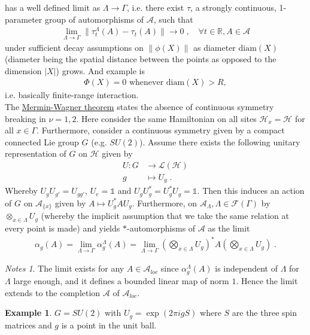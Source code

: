 \documentclass[
a4paper, %
11pt, %
onecolumn, %
openany, %
]{memoir}
\theoremstyle{definition}
\newtheorem{example}[definition]{Example}
\theoremstyle{remark}
\newtheorem{notes}[definition]{Notes}
\theoremstyle{plain}
\begin{document}
has a well defined limit as $\Lambda\rightarrow\Gamma$, i.e. there exist $\tau$, a strongly continuous, 1-parameter group of automorphisms of $\mathcal{A}$, such that \begin{align}
\lim\limits_{\Lambda\rightarrow\Gamma}\|\tau_t^{\Lambda}(A)-\tau_t(A)\|\rightarrow 0\; , \quad \forall t\in\mathbb{R},A\in\mathcal{A}
\end{align}
under sufficient decay assumptions on $\|\phi(X)\|$ as diameter $\mathrm{diam}(X)$ (diameter being the spatial distance between the points as opposed to the dimension $|X|$) grows. And example is \begin{align}
\Phi(X)=0 \text{ whenever } \mathrm{diam}(X) > R, 
\end{align} i.e. basically finite-range interaction.\\
The \underline{Mermin-Wagner theorem} states the absence of continuous symmetry breaking in $\nu=1,2$. Here consider the same Hamiltonian on all sites $\mathcal{H}_x=\mathcal{H}$ for all $x\in\Gamma$. Furthermore, consider a continuous symmetry given by a compact connected Lie group $G$ (e.g. $SU(2)$). Assume there exists the following unitary representation of $G$ on $\mathcal{H}$ given by \begin{align}
U:G&\longrightarrow \mathcal{L}(\mathcal{H}) \\
g&\longmapsto U_g\; .
\end{align}
Whereby $U_gU_{g'}=U_{gg'}$, $U_{e}=\mathds{1}$ and $U_gU_g^*=U_g^*U_g=\mathds{1}$. Then this induces an action of $G$ on $\mathcal{A}_{\{x\}}$ given by $A\mapsto U_g^*A U_g$. Furthermore, on $\mathcal{A}_{\Lambda}, \Lambda\in\mathcal{F}(\Gamma)$ by $\otimes_{x\in\Lambda}U_g$ (whereby the implicit assumption that we take the same relation at every point is made) and yields $*$-automorphisms of $\mathcal{A}$ as the limit \begin{align}
\alpha_g(A)=\lim_{\Lambda\rightarrow\Gamma}\alpha_g^{\Lambda}(A) =\lim_{\Lambda\rightarrow\Gamma} \left(\bigotimes_{x\in\Lambda}U_g\right)^*A\left(\bigotimes_{x\in\Lambda}U_g\right)\; .
\end{align}
\begin{notes}
The limit exists for any $A\in\mathcal{A}_{loc}$ since $\alpha_g^{\Lambda}(A)$ is independent of $\Lambda$ for $\Lambda$ large enough, and it defines a bounded linear map of norm $1$. Hence the limit extends to the completion $\mathcal{A}$ of $\mathcal{A}_{loc}$.
\end{notes}
\begin{example}
$G=SU(2)$ with $U_g=\exp(2\pi i g S)$ where $S$ are the three spin matrices and $g$ is a point in the unit ball.
\end{example}
\end{document}
